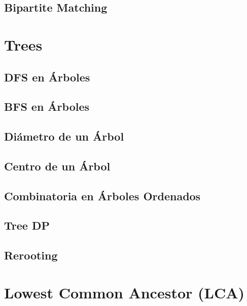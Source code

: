 \documentclass[10pt,a4paper,twocolumn]{article}
\begin{document}
\subsection{Bipartite Matching}



\section{Trees}

\subsection{DFS en Árboles}

\subsection{BFS en Árboles}

\subsection{Diámetro de un Árbol}

\subsection{Centro de un Árbol}

\subsection{Combinatoria en Árboles Ordenados}

\subsection{Tree DP}

\subsection{Rerooting}



\section{Lowest Common Ancestor (LCA)}
\end{document}
